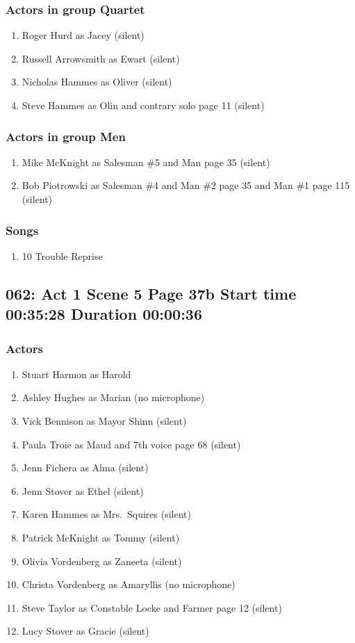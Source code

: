 \subsubsection{Actors in group Quartet}
\begin{enumerate}
\item Roger Hurd as Jacey (silent)
\item Russell Arrowsmith as Ewart (silent)
\item Nicholas Hammes as Oliver (silent)
\item Steve Hammes as Olin and contrary solo page 11 (silent)
\end{enumerate}
\subsubsection{Actors in group Men}
\begin{enumerate}
\item Mike McKnight as Salesman \#5 and Man page 35 (silent)
\item Bob Piotrowski as Salesman \#4 and Man \#2 page 35 and Man \#1 page 115 (silent)
\end{enumerate}

\subsubsection{Songs}
\begin{enumerate}
\item 10 Trouble Reprise
\end{enumerate}
\subsection{062: Act 1 Scene 5 Page 37b Start time 00:35:28 Duration 00:00:36}

\subsubsection{Actors}
\begin{enumerate}
\item Stuart Harmon as Harold
\item Ashley Hughes as Marian (no microphone)
\item Vick Bennison as Mayor Shinn (silent)
\item Paula Troie as Maud and 7th voice page 68 (silent)
\item Jenn Fichera as Alma (silent)
\item Jenn Stover as Ethel (silent)
\item Karen Hammes as Mrs.~Squires (silent)
\item Patrick McKnight as Tommy (silent)
\item Olivia Vordenberg as Zaneeta (silent)
\item Christa Vordenberg as Amaryllis (no microphone)
\item Steve Taylor as Constable Locke and Farmer page 12 (silent)
\item Lucy Stover as Gracie (silent)
\end{enumerate}
